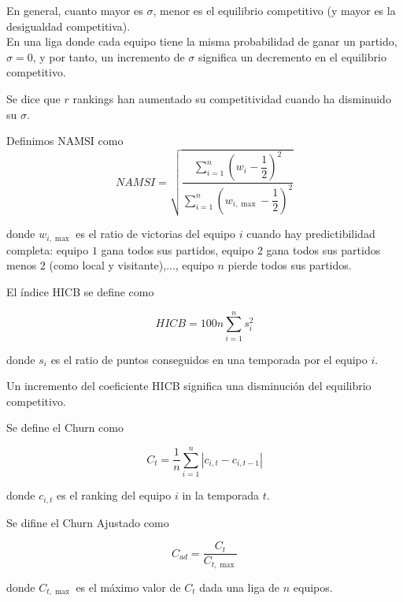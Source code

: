 \begin{nota}
En general, cuanto mayor es $\sigma$, menor es el equilibrio competitivo (y mayor es la desigualdad competitiva).\\

En una liga donde cada equipo tiene la misma probabilidad de ganar un partido, $\sigma = 0$, y por tanto, un incremento de $\sigma$ significa un decremento en el equilibrio competitivo.
\end{nota}

\begin{defi}
Se dice que $r$ rankings han aumentado su competitividad cuando ha disminuido su $\sigma$.
\end{defi}

\begin{defi}
Definimos NAMSI como
\[ NAMSI =  \sqrt{\dfrac{\sum\limits_{i=1}^{n} \left( w_i - \dfrac{1}{2} \right)^2}{\sum\limits_{i=1}^{n} \left(w_{i, \max} -\dfrac{1}{2}\right)^2}} \]

donde $w_{i, \max}$ es el ratio de victorias del equipo $i$ cuando hay predictibilidad completa: equipo $1$ gana todos sus partidos, equipo $2$ gana todos sus partidos menos $2$ (como local y visitante),..., equipo $n$ pierde todos sus partidos.

\end{defi}

\begin{defi}
El índice HICB se define como

\[ HICB = 100n \sum_{i=1}^{n} s_i^2 \]

donde $s_i$ es el ratio de puntos conseguidos en una temporada por el equipo $i$.
\end{defi}

\begin{nota}
Un incremento del coeficiente HICB significa una disminución del equilibrio competitivo.
\end{nota}

\begin{defi}
Se define el Churn como

\[ C_t = \dfrac{1}{n} \sum_{i=1}^{n} |c_{i,t} - c_{i,t-1}| \]

donde $c_{i,t}$ es el ranking del equipo $i$ in la temporada $t$.
\end{defi}

\begin{defi}
Se difine el Churn Ajustado como

\[ C_{ad} = \dfrac{C_t}{C_{t, \max}} \]

donde $C_{t, \max}$ es el máximo valor de $C_t$ dada una liga de $n$ equipos.
\end{defi}

